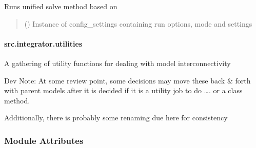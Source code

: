 \documentclass[letterpaper,10pt,english]{sphinxmanual}
\begin{document}
\begin{fulllineitems}
\label{\detokenize{src.integrator.unified:src.integrator.unified.run_unified}}
\pysigstartsignatures
\pysiglinewithargsret
{}
{}
{}
\pysigstopsignatures
\sphinxAtStartPar
Runs unified solve method based on
\begin{quote}\begin{description}
\sphinxAtStartPar
{} ({\hyperref[\detokenize{src.common.config_setup:src.common.config_setup.Config_settings}]{}}) \textendash{} Instance of config\_settings containing run options, mode and settings

\end{description}\end{quote}

\end{fulllineitems}


\sphinxstepscope


\paragraph{src.integrator.utilities}
\label{\detokenize{src.integrator.utilities:module-src.integrator.utilities}}\label{\detokenize{src.integrator.utilities:src-integrator-utilities}}\label{\detokenize{src.integrator.utilities::doc}}
\sphinxAtStartPar
A gathering of utility functions for dealing with model interconnectivity

\sphinxAtStartPar
Dev Note:  At some review point, some decisions may move these back \& forth with parent
models after it is decided if it is a utility job to do …. or a class method.

\sphinxAtStartPar
Additionally, there is probably some renaming due here for consistency
\subsubsection*{Module Attributes}
\end{document}

